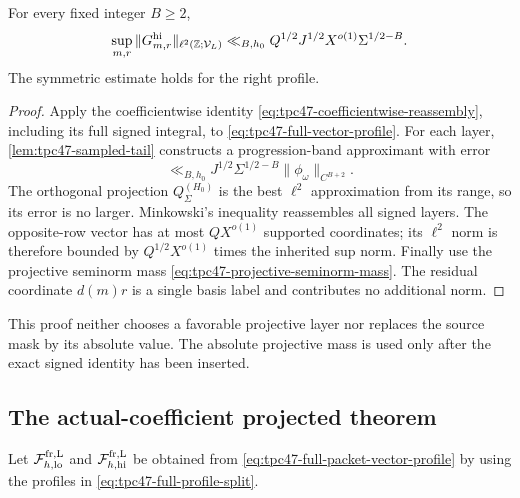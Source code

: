 \begin{proposition}
\label{prop:tpc47-full-profile-tail}
For every fixed integer \(B\ge2\),
\begin{equation}
 \sup_{m,r}
 \|G_{m,r}^{\rm hi}\|_{\ell^2(\mathbb Z;\mathcal V_L)}
 \ll_{B,h_0}
 Q^{1/2}J^{1/2}X^{o(1)}
 \Sigma^{1/2-B}.
 \label{eq:tpc47-full-profile-tail}
\end{equation}
The symmetric estimate holds for the right profile.
\end{proposition}

\begin{proof}
Apply the coefficientwise identity
\eqref{eq:tpc47-coefficientwise-reassembly}, including its full signed
integral, to \eqref{eq:tpc47-full-vector-profile}.  For each layer,
\cref{lem:tpc47-sampled-tail} constructs a progression-band
approximant with error
\[
 \ll_{B,h_0}J^{1/2}\Sigma^{1/2-B}
 \|\phi_\omega\|_{C^{B+2}}.
\]
The orthogonal projection \(Q_\Sigma^{(H_0)}\) is the best
\(\ell^2\) approximation from its range, so its error is no larger.
Minkowski's inequality reassembles all signed layers.  The
opposite-row vector has at most \(QX^{o(1)}\) supported coordinates;
its \(\ell^2\) norm is therefore bounded by \(Q^{1/2}X^{o(1)}\) times
the inherited sup norm.  Finally use the projective seminorm mass
\eqref{eq:tpc47-projective-seminorm-mass}.  The residual coordinate
\(d(m)r\) is a single basis label and contributes no additional norm.
\end{proof}

This proof neither chooses a favorable projective layer nor replaces
the source mask by its absolute value.  The absolute projective mass is
used only after the exact signed identity has been inserted.

\subsection{The actual-coefficient projected theorem}

Let \(\mathcal F_{h,\rm lo}^{\rm fr,L}\) and
\(\mathcal F_{h,\rm hi}^{\rm fr,L}\) be obtained from
\eqref{eq:tpc47-full-packet-vector-profile} by using the profiles in
\eqref{eq:tpc47-full-profile-split}.

